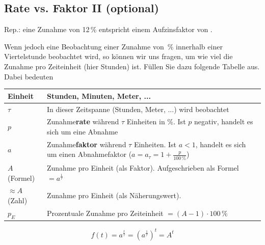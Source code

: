 \subsection{Rate vs. Faktor II (optional)}

Rep.: eine Zunahme von 12\,\% entspricht einem Aufzinsfaktor von .

Wenn jedoch eine Beobachtung einer Zunahme von \,\% innerhalb einer Viertelstunde beobachtet wird, so können wir uns fragen, um wie viel die Zunahme pro Zeiteinheit (hier Stunden) ist.
\newpage
Füllen Sie dazu folgende Tabelle aus. Dabei bedeuten

\begin{tabular}{lp{14cm}}\hline
  Einheit & Stunden, Minuten, Meter, ... \\\hline
  $\tau$  & In dieser Zeitspanne (Stunden, Meter, ...) wird beobachtet \\\hline
  $p$     & Zunahme\textbf{rate}\index{Zunahmerate}\index{Rate} während $\tau$ Einheiten in \%. Ist $p$ negativ, handelt es sich um eine Abnahme\\\hline
  $a$ & Zunahme\textbf{faktor}\index{Zunahmefaktor} während
  $\tau$ Einheiten. Ist $a<1$, handelt es sich um einen Abnahmefaktor
  ($a = a_{\tau} = 1+\frac{p}{100\,\%}$)\\\hline
  $A$ (Formel)   & Zunahme pro Einheit (als Faktor). Aufgeschrieben
  als Formel $=a^{\frac1{\tau}}$\\\hline
  $\approx A$ (Zahl)  & Zunahme pro Einheit (als Näherungswert).\\\hline
  $p_E$   & Prozentuale Zunahme pro Zeiteinheit $=(A-1)\cdot{}100\,\%$\\\hline
  \end{tabular} 

\leserluft{}
\leserluft{}
\newcommand{\ph}[1]{\noTRAINER{...........}\TRAINER{#1}}

$$f(t) = a^{\frac{t}\tau} = \left(a^{\frac1\tau}\right)^t= A^t$$

